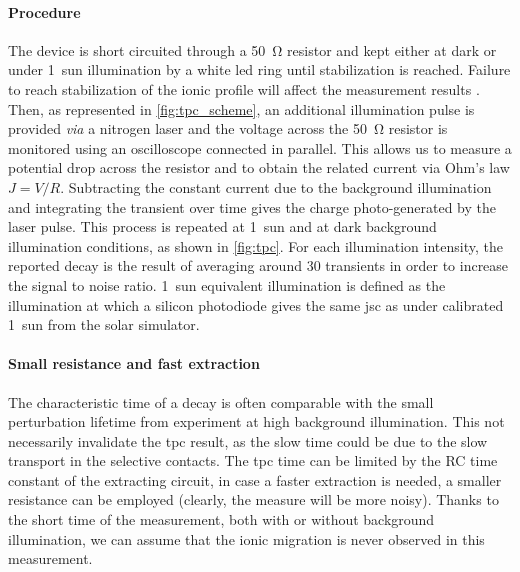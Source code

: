 	\paragraph{Procedure}
	The device is short circuited through a \SI{50}{\ohm} resistor and kept either at dark or under 1~sun illumination by a white \gls{led} ring until stabilization is reached.
	Failure to reach stabilization of the ionic profile will affect the measurement results \cite{Belisle2017}.
	Then, as represented in \cref{fig:tpc_scheme}, an additional illumination pulse is provided \textsl{via} a nitrogen laser and the voltage across the \SI{50}{\ohm} resistor is monitored using an oscilloscope connected in parallel.
	This allows us to measure a potential drop across the resistor and to obtain the related current via Ohm's law $J = V / R$.
	Subtracting the constant current due to the background illumination and integrating the transient over time gives the charge photo\hyp{}generated by the laser pulse.
	This process is repeated at 1~sun and at dark background illumination conditions, as shown in \cref{fig:tpc}.
	For each illumination intensity, the reported decay is the result of averaging around 30 transients in order to increase the signal to noise ratio.
	1~sun equivalent illumination is defined as the illumination at which a silicon photodiode gives the same \gls{jsc} as under calibrated 1~sun from the solar simulator.

	\paragraph{Small resistance and fast extraction}
	The characteristic time of a  decay is often comparable with the small perturbation lifetime from  experiment at high background illumination.
	This not necessarily invalidate the \gls{tpc} result, as the slow time could be due to the slow transport in the selective contacts.
	The \gls{tpc} time can be limited by the RC time constant of the extracting circuit, in case a faster extraction is needed, a smaller resistance can be employed (clearly, the measure will be more noisy).
	Thanks to the short time of the measurement, both with or without background illumination, we can assume that the ionic migration is never observed in this measurement.

